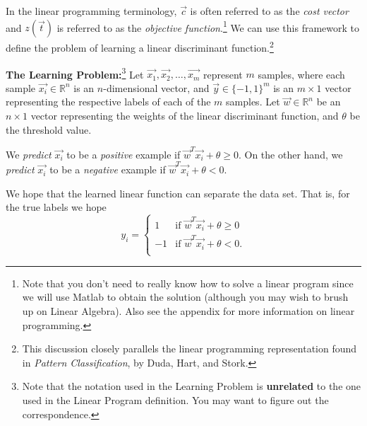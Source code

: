 \begin{enumerate}
In the linear programming terminology, $\vec{c}$ is often referred
to as the {\em cost vector} and $z(\vec{t})$ is referred to as the {\em objective
function}.\footnote{Note that you don't need
to really know how to solve a linear program since we will use Matlab to obtain the
solution (although you may wish to brush up on Linear Algebra). 
Also see the appendix for more information on linear programming.}
We can use this framework to define the problem of learning a linear
discriminant function.\footnote{This discussion closely
  parallels the linear programming representation found in 
  {\em Pattern Classification}, by Duda, Hart, and Stork.}

\textbf{The Learning Problem:}\footnote{Note that the notation used in the
Learning Problem is
{\bf unrelated} to the one used in the Linear Program definition. You may want to
figure out the correspondence.} \hspace{2mm}
Let $\vec{x_1}, \vec{x_2}, \ldots, \vec{x_m}$ 
represent $m$ samples, where each sample $\vec{x_i}\in \mathbb{R}^n$ is an $n$-dimensional
vector, and $\vec{y} \in \{-1, 1\}^m$ is an $m \times 1$
vector representing the respective labels of each of the $m$ samples. Let
$\vec{w} \in \mathbb{R}^n$ be an $n \times 1$ vector representing the weights of the
linear discriminant function, and $\theta$ be the threshold value. 

We {\em predict} $\vec{x_i}$ to be a {\em positive} example if
$\vec{w}^T \vec{x_i} + \theta \geq 0$. On the other hand, we {\em predict}
$\vec{x_i}$ to be a {\em negative} example if $\vec{w}^T \vec{x_i} + \theta < 0$.

We hope that the learned linear function can separate the data set.  
That is, for the true labels we hope
\begin{equation}
\label{eq:separable}
y_i = \begin{cases}
 1 & \mbox{if } \vec{w}^T \vec{x_i} + \theta \ge 0 \\
-1 & \mbox{if } \vec{w}^T \vec{x_i} + \theta < 0. \\
\end{cases}
\end{equation}


\end{enumerate}
